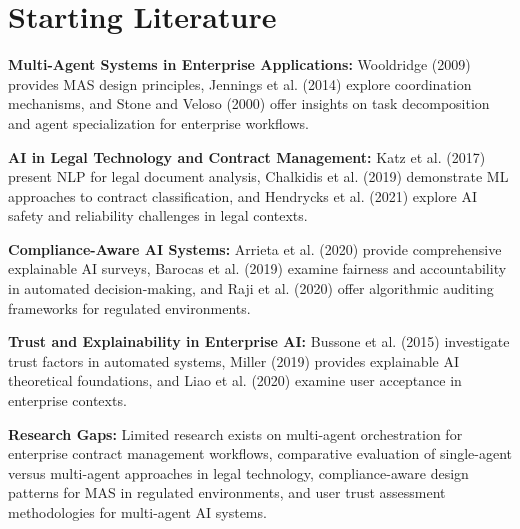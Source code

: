 
\chapter{Starting Literature}\label{chapter:starting_literature}

\textbf{Multi-Agent Systems in Enterprise Applications:} Wooldridge (2009) provides MAS design principles, Jennings et al. (2014) explore coordination mechanisms, and Stone and Veloso (2000) offer insights on task decomposition and agent specialization for enterprise workflows.

\textbf{AI in Legal Technology and Contract Management:} Katz et al. (2017) present NLP for legal document analysis, Chalkidis et al. (2019) demonstrate ML approaches to contract classification, and Hendrycks et al. (2021) explore AI safety and reliability challenges in legal contexts.

\textbf{Compliance-Aware AI Systems:} Arrieta et al. (2020) provide comprehensive explainable AI surveys, Barocas et al. (2019) examine fairness and accountability in automated decision-making, and Raji et al. (2020) offer algorithmic auditing frameworks for regulated environments.

\textbf{Trust and Explainability in Enterprise AI:} Bussone et al. (2015) investigate trust factors in automated systems, Miller (2019) provides explainable AI theoretical foundations, and Liao et al. (2020) examine user acceptance in enterprise contexts.

\textbf{Research Gaps:} Limited research exists on multi-agent orchestration for enterprise contract management workflows, comparative evaluation of single-agent versus multi-agent approaches in legal technology, compliance-aware design patterns for MAS in regulated environments, and user trust assessment methodologies for multi-agent AI systems.

